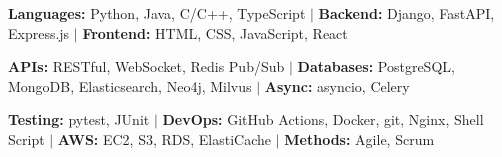\item\small{\textbf{Languages:} Python, Java, C/C++, TypeScript $|$ \textbf{Backend:} Django, FastAPI, Express.js $|$ \textbf{Frontend:} HTML, CSS, JavaScript, React}
\item\small{\textbf{APIs:} RESTful, WebSocket, Redis Pub/Sub $|$ \textbf{Databases:} PostgreSQL, MongoDB, Elasticsearch, Neo4j, Milvus $|$ \textbf{Async:} asyncio, Celery}
\item\small{\textbf{Testing:} pytest, JUnit $|$ \textbf{DevOps:} GitHub Actions, Docker, git, Nginx, Shell Script $|$ \textbf{AWS:} EC2, S3, RDS, ElastiCache $|$ \textbf{Methods:} Agile, Scrum}%
